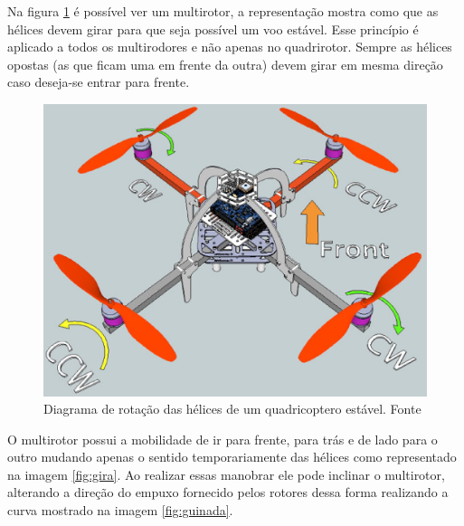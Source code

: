 Na figura \ref{fig:rotacao} é possível ver um multirotor, a representação mostra como que as hélices devem girar para que seja possível 
um voo estável. Esse princípio é aplicado a todos os multirodores e não apenas no quadrirotor. Sempre as hélices opostas (as que ficam 
uma em frente da outra) devem girar em mesma direção caso deseja-se entrar para frente.


\begin{figure}[H]
    \centering
      \includegraphics[keepaspectratio=true,scale=0.5]{figuras/rotacao.eps}
    \caption[Diagrama  de rotação das hélices de um quadricoptero estável]{Diagrama  de rotação das hélices de um quadricoptero estável. Fonte \cite{audronis}}
    \label{fig:rotacao}
\end{figure}

O multirotor possui a mobilidade de ir para frente, para trás e de lado para o outro mudando apenas o sentido temporariamente das hélices
como representado na imagem \ref{fig:gira}. Ao realizar essas manobrar ele pode inclinar o multirotor, alterando a direção do empuxo fornecido 
pelos rotores dessa forma realizando a curva mostrado na imagem \ref{fig:guinada}.

